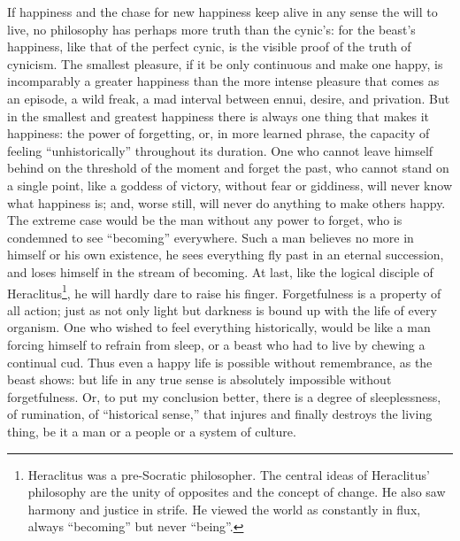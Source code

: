 If happiness and the chase for new happiness keep alive in any sense
the will to live, no philosophy has perhaps more truth than the
cynic's: for the beast's happiness, like that of the perfect cynic,
is the visible proof of the truth of cynicism. The smallest pleasure,
if it be only continuous and make one happy, is incomparably a
greater happiness than the more intense pleasure that comes as an
episode, a wild freak, a mad interval between ennui, desire, and
privation. But in the smallest and greatest happiness there is always
one thing that makes it happiness: the power of forgetting, or, in
more learned phrase, the capacity of feeling \enquote{unhistorically}
throughout its duration. One who cannot leave himself behind on the
threshold of the moment and forget the past, who cannot stand on a
single point, like a goddess of victory, without fear or giddiness,
will never know what happiness is; and, worse still, will never do
anything to make others happy. The extreme case would be the man
without any power to forget, who is condemned to see \enquote{becoming}
everywhere. Such a man believes no more in himself or his own
existence, he sees everything fly past in an eternal succession, and
loses himself in the stream of becoming. At last, like the logical
disciple of Heraclitus\footnote{Heraclitus  was a pre-Socratic philosopher. The central ideas of Heraclitus' philosophy are the unity of opposites and the concept of change. He also saw harmony and justice in strife. He viewed the world as constantly in flux, always \enquote{becoming} but never \enquote{being}.}, he will hardly dare to raise his finger.
Forgetfulness is a property of all action; just as not only light but
darkness is bound up with the life of every organism. One who wished
to feel everything historically, would be like a man forcing himself
to refrain from sleep, or a beast who had to live by chewing a
continual cud. Thus even a happy life is possible without
remembrance, as the beast shows: but life in any true sense is
absolutely impossible without forgetfulness. Or, to put my conclusion
better, there is a degree of sleeplessness, of rumination, of
\enquote{historical sense,} that injures and finally destroys the living
thing, be it a man or a people or a system of culture.

